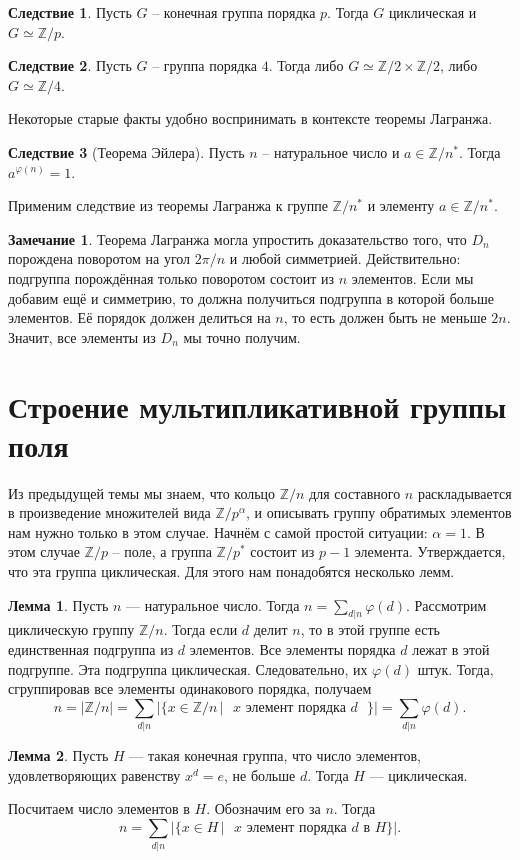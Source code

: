 \documentclass[10pt,a4paper,oneside]{book}
\theoremstyle{definition}
\newtheorem*{rem}{\color{green!50!blue}Замечание}
\newtheorem{lem}{\color{green!50!black}Лемма}
\newtheorem{cor}{\color{green!45!black}Следствие}
\newcommand{\mb}[1]{\mathbb{#1}}
\def\ffi{\varphi}
\def\lm{\begin{lem}}
\def\elm{\end{lem}}
\def\crl{\begin{cor}}
\def\ecrl{\end{cor}}
\def\rm{\begin{rem}}
\def\erm{\end{rem}}
\begin{document}
\crl Пусть $G$ -- конечная группа порядка $p$. Тогда $G$ циклическая и $G \simeq \mb Z/p$. 
\ecrl

\crl Пусть $G$ -- группа порядка $4$. Тогда либо $G \simeq \mb Z/2 \times \mb Z/2$, либо $G \simeq \mb Z/4$.
\ecrl



Некоторые старые факты удобно воспринимать в контексте теоремы Лагранжа.


\crl[Теорема Эйлера] Пусть $n$ -- натуральное число и $a\in \mb Z/n^*$. Тогда $a^{\ffi(n)}=1$.
\ecrl
\proof
Применим следствие из теоремы Лагранжа к группе $\mb Z/n^*$ и элементу $a\in \mb Z/n^*$.
\endproof

\rm Теорема Лагранжа могла упростить доказательство того, что $D_n$ порождена поворотом на угол $2\pi/n$ и любой симметрией. Действительно: подгруппа порождённая только поворотом состоит из $n$ элементов. Если мы добавим ещё и симметрию, то должна получиться подгруппа в которой больше элементов. Её порядок должен делиться на $n$, то  есть должен быть не меньше $2n$. Значит, все элементы из $D_n$ мы точно получим.
\erm 




\section{Строение мультипликативной группы поля}


Из предыдущей темы мы знаем, что кольцо $\mb Z/n$ для составного $n$ раскладывается в произведение множителей вида $\mb Z/p^{\alpha}$, и описывать группу обратимых элементов нам нужно только в этом случае. Начнём с самой простой ситуации: $\alpha=1$. В этом случае $\mb Z/p$ -- поле, а группа $\mb Z/p^*$ состоит из $p-1$ элемента. Утверждается, что эта группа циклическая. Для этого нам понадобятся несколько лемм. 

\lm Пусть $n$ --- натуральное число. Тогда $n = \sum_{d|n}\varphi(d)$.
\proof  Рассмотрим циклическую группу $\mb Z/n$. Тогда если $d$ делит $n$, то в этой группе есть единственная подгруппа из $d$ элементов. Все элементы порядка $d$ лежат в этой подгруппе. Эта подгруппа циклическая. Следовательно, их $\ffi(d)$ штук. Тогда, сгруппировав все элементы одинакового порядка, получаем
$$n= |\mb Z/n |= \sum_{d|n} |\{ x \in \mb Z/n \,| \text{ $x$ элемент порядка $d$  }\}| = \sum_{d|n}\varphi(d).$$
\endproof
\elm

\lm Пусть $H$ --- такая конечная группа, что число элементов, удовлетворяющих равенству $x^d= e$, не больше $d$. Тогда $H$ --- циклическая.
\elm
\proof Посчитаем число элементов в $H$. Обозначим его за $n$. Тогда
$$ n = \sum_{d|n} |\{ x \in H \,|\text{  $x$ элемент порядка $d$ в $H$} \}|.$$
\end{document}
